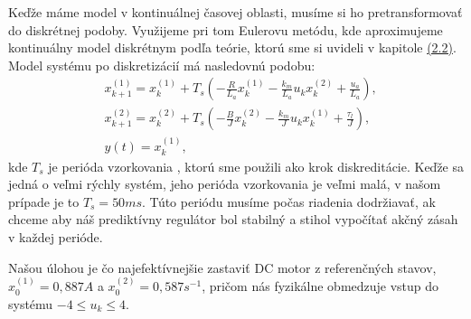 Keďže máme model v kontinuálnej časovej oblasti, musíme si ho pretransformovať do diskrétnej podoby. Využijeme pri tom Eulerovu metódu, kde aproximujeme kontinuálny model diskrétnym podľa teórie, ktorú sme si uvideli v kapitole \hyperref[se:diskretizacia]{(2.2)}. Model systému po diskretizácií má nasledovnú podobu:
\begin{subequations}
\label{math:Dmodel_DC}
\begin{align}
& x_{k+1}^{(1)} = x^{(1)}_{k}+T_{s}\left(- \frac{R}{L_{a}}x^{(1)}_{k} - \frac{k_{m}}{L_{a}}u_{k}x^{(2)}_{k} + \frac{u_a}{L_a}\right),\\
& x_{k+1}^{(2)} = x^{(2)}_{k}+T_{s}\left(- \frac{B}{J}x^{(2)}_{k} - \frac{k_{m}}{J}u_{k}x^{(1)}_{k} + \frac{\tau_l}{J}\right),\\
& y(t) = x^{(1)}_{k},
\end{align}
\end{subequations}
kde $T_{s}$ je perióda vzorkovania , ktorú sme použili ako krok diskreditácie. Keďže sa jedná o veľmi rýchly systém, jeho perióda vzorkovania je veľmi malá, v našom prípade je to $T_{s} = 50ms$. Túto periódu musíme počas riadenia dodržiavať, ak chceme aby náš prediktívny regulátor bol stabilný a stihol vypočítať akčný zásah v každej perióde.

Našou úlohou je čo najefektívnejšie zastaviť DC motor z referenčných stavov, $x_{0}^{(1)}=0,887 A$ a $x_{0}^{(2)}=0,587 s^{-1}$, pričom nás fyzikálne obmedzuje vstup do systému $-4 \leq u_{k} \leq 4$. 

